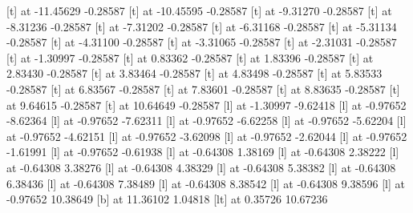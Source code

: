  [t] at -11.45629 -0.28587
 [t] at -10.45595 -0.28587
 [t] at -9.31270 -0.28587
 [t] at -8.31236 -0.28587
 [t] at -7.31202 -0.28587
 [t] at -6.31168 -0.28587
 [t] at -5.31134 -0.28587
 [t] at -4.31100 -0.28587
 [t] at -3.31065 -0.28587
 [t] at -2.31031 -0.28587
 [t] at -1.30997 -0.28587
 [t] at 0.83362 -0.28587
 [t] at 1.83396 -0.28587
 [t] at 2.83430 -0.28587
 [t] at 3.83464 -0.28587
 [t] at 4.83498 -0.28587
 [t] at 5.83533 -0.28587
 [t] at 6.83567 -0.28587
 [t] at 7.83601 -0.28587
 [t] at 8.83635 -0.28587
 [t] at 9.64615 -0.28587
 [t] at 10.64649 -0.28587
 [l] at -1.30997 -9.62418
 [l] at -0.97652 -8.62364
 [l] at -0.97652 -7.62311
 [l] at -0.97652 -6.62258
 [l] at -0.97652 -5.62204
 [l] at -0.97652 -4.62151
 [l] at -0.97652 -3.62098
 [l] at -0.97652 -2.62044
 [l] at -0.97652 -1.61991
 [l] at -0.97652 -0.61938
 [l] at -0.64308 1.38169
 [l] at -0.64308 2.38222
 [l] at -0.64308 3.38276
 [l] at -0.64308 4.38329
 [l] at -0.64308 5.38382
 [l] at -0.64308 6.38436
 [l] at -0.64308 7.38489
 [l] at -0.64308 8.38542
 [l] at -0.64308 9.38596
 [l] at -0.97652 10.38649
 [b] at 11.36102 1.04818
 [lt] at 0.35726 10.67236
\endpicture
